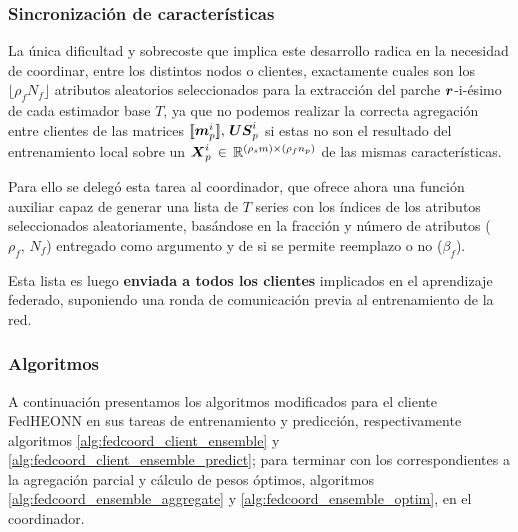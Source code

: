 \documentclass[00-Trabajo_Final.tex]{subfiles}
\begin{document}
\subsubsection*{Sincronización de características}

La única dificultad y sobrecoste que implica este desarrollo radica en la necesidad de coordinar, entre los distintos nodos o clientes, exactamente cuales son los $\lfloor \rho_f N_f \rfloor$ atributos aleatorios seleccionados para la extracción del parche $\boldsymbol{r}$-i-ésimo de cada estimador base $T$, ya que no podemos realizar la correcta agregación entre clientes de las matrices $[\![\boldsymbol{m}_p^i]\!],\,\boldsymbol{US}_p^i$ si estas no son el resultado del entrenamiento local sobre un $\boldsymbol{X}_p^i \, \in \, \mathbb{R}^{(\rho_s m) \times (\rho_f n_p)}$ de las mismas características.

\vspace{0.5em}

Para ello se delegó esta tarea al coordinador, que ofrece ahora una función auxiliar capaz de generar una lista de $T$ series con los índices de los atributos seleccionados aleatoriamente, basándose en la fracción y número de atributos ($\rho_f,\,N_f$) entregado como argumento y de si se permite reemplazo o no ($\beta_f$).

\vspace{0.5em}

Esta lista es luego \textbf{enviada a todos los clientes} implicados en el aprendizaje federado, suponiendo una ronda de comunicación previa al entrenamiento de la red.

\subsubsection*{Algoritmos}

A continuación presentamos los algoritmos modificados para el cliente FedHEONN en sus tareas de entrenamiento y predicción, respectivamente algoritmos \ref{alg:fedcoord_client_ensemble} y \ref{alg:fedcoord_client_ensemble_predict}; para terminar con los correspondientes a la agregación parcial y cálculo de pesos óptimos, algoritmos \ref{alg:fedcoord_ensemble_aggregate} y \ref{alg:fedcoord_ensemble_optim}, en el coordinador.
\end{document}
